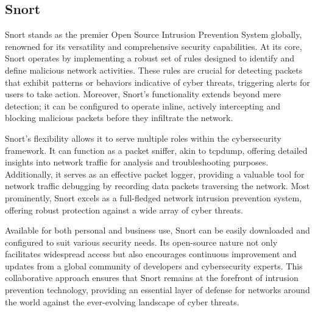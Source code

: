 \subsection{Snort}
\vspace{-18pt}
Snort stands as the premier Open Source Intrusion Prevention System globally, renowned for its versatility and comprehensive security capabilities. At its core, Snort operates by implementing a robust set of rules designed to identify and define malicious network activities. These rules are crucial for detecting packets that exhibit patterns or behaviors indicative of cyber threats, triggering alerts for users to take action. Moreover, Snort's functionality extends beyond mere detection; it can be configured to operate inline, actively intercepting and blocking malicious packets before they infiltrate the network.\par 
Snort's flexibility allows it to serve multiple roles within the cybersecurity framework. It can function as a packet sniffer, akin to tcpdump, offering detailed insights into network traffic for analysis and troubleshooting purposes. Additionally, it serves as an effective packet logger, providing a valuable tool for network traffic debugging by recording data packets traversing the network. Most prominently, Snort excels as a full-fledged network intrusion prevention system, offering robust protection against a wide array of cyber threats.\par 
Available for both personal and business use, Snort can be easily downloaded and configured to suit various security needs. Its open-source nature not only facilitates widespread access but also encourages continuous improvement and updates from a global community of developers and cybersecurity experts. This collaborative approach ensures that Snort remains at the forefront of intrusion prevention technology, providing an essential layer of defense for networks around the world against the ever-evolving landscape of cyber threats\cite{Snort}.
\vspace{-10pt}
